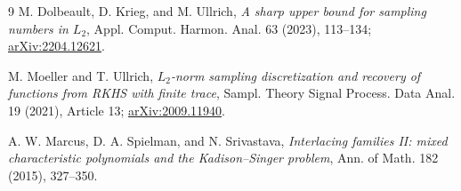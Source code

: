 \documentclass[10pt]{article}
\begin{document}
\begin{thebibliography}{9}
M. Dolbeault, D. Krieg, and M. Ullrich,
\emph{A sharp upper bound for sampling numbers in $L_2$},
Appl. Comput. Harmon. Anal. 63 (2023), 113--134;
\href{https://arxiv.org/abs/2204.12621}{arXiv:2204.12621}.

M. Moeller and T. Ullrich,
\emph{$L_2$-norm sampling discretization and recovery of functions from
RKHS with finite trace},
Sampl. Theory Signal Process. Data Anal. 19 (2021), Article 13;
\href{https://arxiv.org/abs/2009.11940}{arXiv:2009.11940}.

A. W. Marcus, D. A. Spielman, and N. Srivastava,
\emph{Interlacing families II: mixed characteristic polynomials and the
Kadison--Singer problem},
Ann. of Math. 182 (2015), 327--350.
\end{thebibliography}
\end{document}

